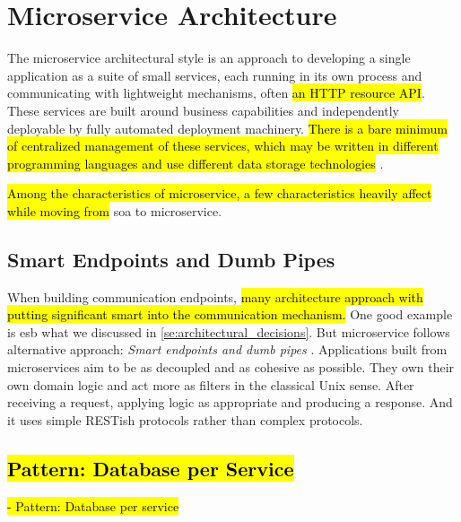 \section{Microservice Architecture}

The microservice architectural style is an approach to developing a single application as a suite of small services, each running in its own process and communicating with lightweight mechanisms, often \hl{an HTTP resource API}. These services are built around business capabilities and independently deployable by fully automated deployment machinery. \hl{There is a bare minimum of centralized management of these services, which may be written in different programming languages and use different data storage technologies} \cite{LewisMicroservices}.

\hl{Among the characteristics of microservice, a few characteristics heavily affect while moving from} \acrshort{soa} to microservice.

\subsection{Smart Endpoints and Dumb Pipes}
\label{subse:dumb_pipes}

When building communication endpoints, \hl{many architecture approach with putting significant smart into the communication mechanism.} One good example is \acrshort{esb} what we discussed in \cref{se:architectural_decisions}. But microservice follows alternative approach: \emph{Smart endpoints and dumb pipes} \cite{LewisMicroservicesPipes}.
Applications built from microservices aim to be as decoupled and as cohesive as possible. They own their own domain logic and act more as filters in the classical Unix sense. After receiving a request, applying logic as appropriate and producing a response. And it uses simple RESTish protocols rather than complex protocols.

\subsection{\hl{Pattern: Database per Service}}
\label{subse:database_per_service}
\hl{- Pattern: Database per service} 

